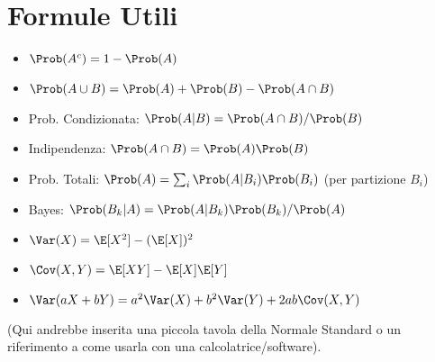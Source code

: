 \section{Formule Utili}
\begin{itemize}
    \item $\Prob(A^c) = 1 - \Prob(A)$
    \item $\Prob(A \cup B) = \Prob(A) + \Prob(B) - \Prob(A \cap B)$
    \item Prob. Condizionata: $\Prob(A|B) = \Prob(A \cap B) / \Prob(B)$
    \item Indipendenza: $\Prob(A \cap B) = \Prob(A)\Prob(B)$
    \item Prob. Totali: $\Prob(A) = \sum_i \Prob(A|B_i)\Prob(B_i)$ (per partizione $B_i$)
    \item Bayes: $\Prob(B_k|A) = \Prob(A|B_k)\Prob(B_k) / \Prob(A)$
    \item $\Var(X) = \E[X^2] - (\E[X])^2$
    \item $\Cov(X,Y) = \E[XY] - \E[X]\E[Y]$
    \item $\Var(aX+bY) = a^2\Var(X) + b^2\Var(Y) + 2ab\Cov(X,Y)$
\end{itemize}
(Qui andrebbe inserita una piccola tavola della Normale Standard o un riferimento a come usarla con una calcolatrice/software).

